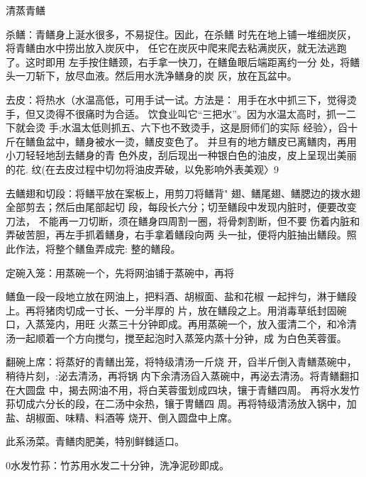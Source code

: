 \begin{recipe}{清蒸青鳝}

\ingredients



\cooking

\step 	杀鳝：青鳝身上涎水很多，不易捉住。因此，在杀鳝 时先在地上铺一堆细炭灰，将青鳝由水中捞出放入炭灰中， 任它在炭灰中爬来爬去粘满炭灰，就无法逃跑了。这时即用 左手按住鳝颈，右手拿一快刀，在鳝鱼眼后端距离约一分 处，将鳝头一刀斩下，放尽血液。然后用水洗净鳝身的炭 灰，放在瓦盆中。

\step 	去皮：将热水（水温高低，可用手试一试。方法是： 用手在水中抓三下，觉得烫手，但又烫得不很痛时为合适。 饮食业叫它“三把水”。因为水温太高时，抓一二下就会烫 手;水温太低则抓五、六下也不致烫手，这是厨师们的实际 经验〉，舀十斤在鳝鱼盆中，鳝身被水一烫，鳝皮变色了。 并旦有的地方鳝皮已离鳝肉，再用小刀轻轻地刮去鳝身的青 色外皮，刮后现出一种银白色的油皮，皮上呈现岀美丽的花. 纹(在去皮过程中切勿将油皮弄破，以免影响外表美观〉9

\step 	去鳝翅和切段：将鳝平放在案板上，用剪刀将鳝背" 翅、鳝尾翅、鳝腮边的拨水翅全部剪去；然后由尾部起切 段，每段长六分；切至鳝段中发现内脏时，便要改变刀法， 不能再一刀切断，须在鳝身四周割一圈，将骨刺割断，但不要 伤着内脏和弄破苦胆，再左手抓着鳝身，右手拿着鳝段向两 头一扯，便将内脏抽出鳝段。照此作法，将整个鳝鱼弄成完: 整的鳝段。

\step 定碗入笼：用蒸碗一个，先将网油铺于蒸碗中，再将

鳝鱼一段一段地立放在网油上，把料酒、胡椒面、盐和花椒 一起拌匀，淋于鳝段上。再将猪肉切成一寸长、一分半厚的 片，放在鳝段之上。用消毒草纸封固碗口，入蒸笼内，用旺 火蒸三十分钟即成。再用蒸碗一个，放入蛋清二个，和冷清 汤一起顺着一个方向搅匀，搅至起泡时入蒸笼内蒸十分钟，成 为白色芙蓉蛋。

\step 翻碗上席：将蒸好的青鳝出笼，将特级清汤一斤烧 开，舀半斤倒入青鳝蒸碗中，稍待片刻，:泌去清汤，再将锅 内下余清汤舀入蒸碗中，再泌去清汤。将青鳝翻扣在大圆盘 中，揭去网油不用，将白芙蓉蛋划成四块，镶于青鳝四周。 再将水发竹荪切成六分长的段，在二汤中汆热，镶于冑鳝四 周。再将特级清汤放入锅中，加盐、胡椒面、味精、料酒等 烧开、倒入圆盘中上席。

\notes

此系汤菜。青鳝肉肥美，特别鲜雠适口。

0水发竹荪：竹苏用水发二十分钟，洗净泥砂即成。

\end{recipe}

